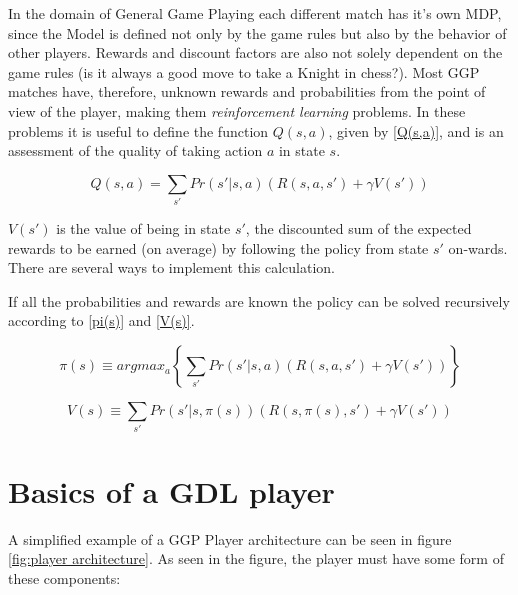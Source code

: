 In the domain of General Game Playing each different match has it's own \gls{MDP}, since the Model is defined not only by the game rules but also by the behavior of other players. Rewards and discount factors are also not solely dependent on the game rules (is it always a good move to take a Knight in chess?).
Most GGP matches have, therefore, unknown rewards and probabilities from the point of view of the player, making them \textit{reinforcement learning} problems. In these problems it is useful to define the function $Q(s,a)$, given by \ref{Q(s,a)}, and is an assessment of the quality of taking action $a$ in state $s$.

\begin{center}
\begin{equation} \label{Q(s,a)}
Q(s,a) = \sum_{s'} Pr(s' | s, a)(R(s, a, s') + \gamma V(s'))
\end{equation}
\end{center}

$V(s')$ is the value of being in state $s'$, the discounted sum of the expected rewards to be earned (on average) by following the policy from state $s'$ on-wards. There are several ways to implement this calculation.

If all the probabilities and rewards are known the policy can be solved recursively according to \ref{pi(s)} and \ref{V(s)}.

\begin{center}
\begin{equation} \label{pi(s)}
\pi(s) \equiv arg max_{a}\left \{ \sum_{s'} Pr(s' | s, a)(R(s, a, s') + \gamma V(s'))\right \}
\end{equation}
\end{center}

\begin{center}
\begin{equation} \label{V(s)}
V(s) \equiv \sum_{s'} Pr(s' | s, \pi(s))(R(s, \pi(s), s') + \gamma V(s'))
\end{equation}
\end{center}

\section{Basics of a GDL player}

A simplified example of a GGP Player architecture can be seen in figure \ref{fig:player architecture}. As seen in the figure, the player must have some form of these components:

